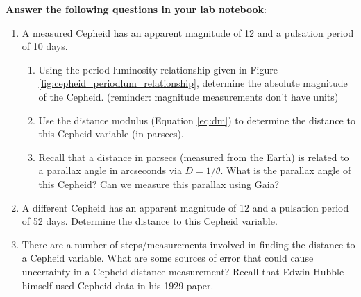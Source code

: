 \documentclass[11pt]{article}
\begin{document}
\textbf{Answer the following questions in your lab notebook}:

\begin{enumerate}[resume]
    \item A measured Cepheid has an apparent magnitude of 12 and a pulsation period of 10 days. 
    \begin{enumerate}
        \item Using the period-luminosity relationship given in Figure \ref{fig:cepheid_periodlum_relationship}, determine the absolute magnitude of the Cepheid. (reminder: magnitude measurements don't have units)
        
        \item Use the distance modulus (Equation \ref{eq:dm}) to determine the distance to this Cepheid variable (in parsecs).
        
        \item Recall that a distance in parsecs (measured from the Earth) is related to a parallax angle in arcseconds via $D = 1/\theta$. What is the parallax angle of this Cepheid? Can we measure this parallax using Gaia?
    \end{enumerate} 
    
    \item A different Cepheid has an apparent magnitude of 12 and a pulsation period of 52 days. Determine the distance to this Cepheid variable. 
    
    \item There are a number of steps/measurements involved in finding the distance to a Cepheid variable. What are some sources of error that could cause uncertainty in a Cepheid distance measurement? Recall that Edwin Hubble himself used Cepheid data in his 1929 paper. 
\end{enumerate}

\end{document}
